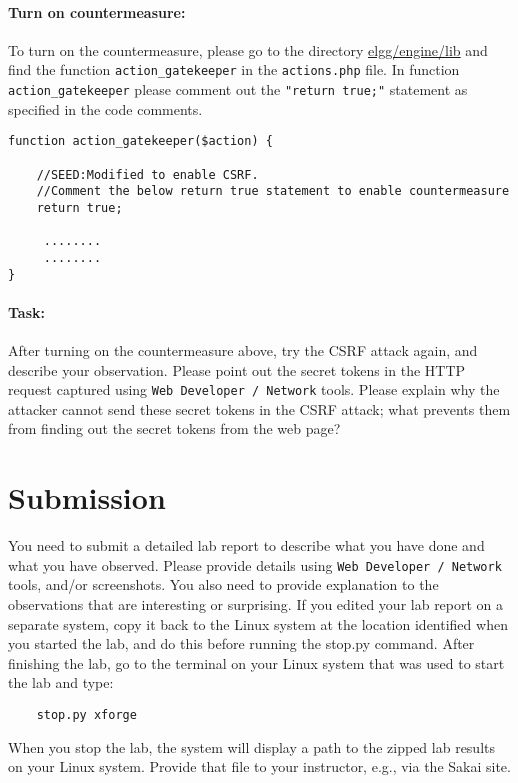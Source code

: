 \paragraph{Turn on countermeasure:}


To turn on the countermeasure, please go to the directory
\url{elgg/engine/lib} and 
find the function {\tt action\_gatekeeper} in the {\tt actions.php} file. 
In function {\tt action\_gatekeeper} please comment out the 
{\tt "return true;"} statement as specified in the code comments.

{\footnotesize
\begin{Verbatim}[frame=single]
function action_gatekeeper($action) {

	//SEED:Modified to enable CSRF. 
	//Comment the below return true statement to enable countermeasure
	return true;

	 ........
	 ........
}
\end{Verbatim}
}

\paragraph{Task:}
After turning on the countermeasure above, try the CSRF attack again, 
and describe your observation. Please point out the secret tokens in the 
HTTP request captured using {\tt Web Developer / Network} tools. Please explain why
the attacker cannot send these secret tokens in the CSRF attack; what
prevents them from finding out the secret tokens from the web page?   


\section{Submission}
You need to submit a detailed lab report to describe what you have
done and what you have observed. Please provide details using
{\tt Web Developer / Network} tools,  and/or screenshots.
You also need to provide explanation
to the observations that are interesting or surprising.
If you edited your lab report on a separate system, copy it back to the Linux system at the location 
identified when you started the lab, and do this before running the stop.py command.
After finishing the lab, go to the terminal on your Linux system that was used to start the lab and type:
\begin{verbatim}
    stop.py xforge
\end{verbatim}
When you stop the lab, the system will display a path to the zipped lab results on your Linux system.  Provide that file to
your instructor, e.g., via the Sakai site.


